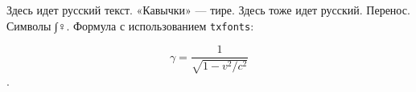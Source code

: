 \documentclass{article}
\begin{document}
Здесь идет русский текст. «Кавычки» — тире.
\textsf{Здесь тоже идет русский}. Перенос.
Символы ∫♀. Формула с использованием \texttt{txfonts}:

\[ \gamma = \frac{1}{\sqrt{1 - v^2/c^2}} \].
\end{document}
